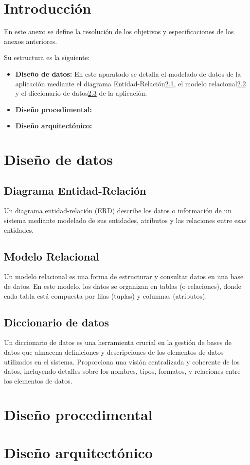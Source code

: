 
\section{Introducción}
En este anexo se define la resolución de los objetivos y especificaciones de los anexos anteriores.

Su estructura es la siguiente:
\begin{itemize}
    \item \textbf{Diseño de datos:} En este aparatado se detalla el modelado de datos de la aplicación mediante el diagrama Entidad-Relación\ref{e-r}, el modelo relacional\ref{modelo-relacional} y el diccionario de datos\ref{diccionario-de-datos} de la aplicación.
    \item \textbf{Diseño procedimental:}
    \item \textbf{Diseño arquitectónico:}
\end{itemize}

\section{Diseño de datos}
\subsection{Diagrama Entidad-Relación}\label{e-r}

Un diagrama entidad-relación (ERD) describe los datos o información de un sistema mediante modelado de sus entidades, atributos y las relaciones entre esas entidades. \cite{Chen1976}

\subsection{Modelo Relacional}\label{modelo-relacional}

Un modelo relacional es una forma de estructurar y consultar datos en una base de datos. En este modelo, los datos se organizan en tablas (o relaciones), donde cada tabla está compuesta por filas (tuplas) y columnas (atributos). \cite{Codd1970}

\subsection{Diccionario de datos}\label{diccionario-de-datos}

Un diccionario de datos es una herramienta crucial en la gestión de bases de datos que almacena definiciones y descripciones de los elementos de datos utilizados en el sistema. Proporciona una visión centralizada y coherente de los datos, incluyendo detalles sobre los nombres, tipos, formatos, y relaciones entre los elementos de datos. \cite{Kent1983}




\section{Diseño procedimental}

\section{Diseño arquitectónico}


